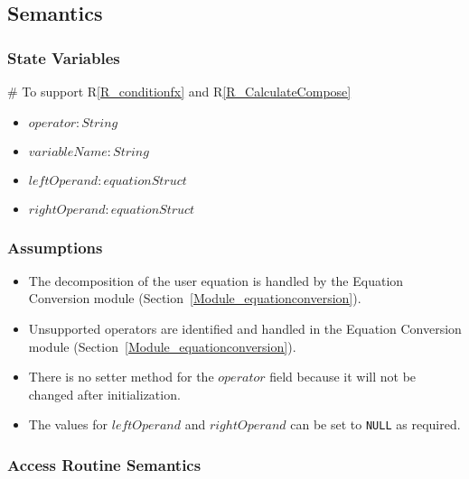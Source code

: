 \documentclass[12pt, titlepage]{article}
\newcommand{\rref}[1]{R\ref{#1}}
\begin{document}
\subsection{Semantics}

\subsubsection{State Variables}

\# To support \rref{R_conditionfx} and \rref{R_CalculateCompose}
\begin{itemize}
	\item $operator : String$
	\item $variableName : String$
	\item $leftOperand : equationStruct$
	\item $rightOperand : equationStruct$
\end{itemize}

\subsubsection{Assumptions}

\begin{itemize}
	\item The decomposition of the user equation is handled by the Equation 
	Conversion module (Section~\ref{Module_equationconversion}).
	\item Unsupported operators are identified and handled in the Equation 
	Conversion module (Section~\ref{Module_equationconversion}).
	\item There is no setter method for the $operator$ field because it will 
	not be changed after initialization.
	\item The values for $leftOperand$ and $rightOperand$ can be set to 
	\texttt{NULL} as required.
\end{itemize}

\subsubsection{Access Routine Semantics}
\end{document}
